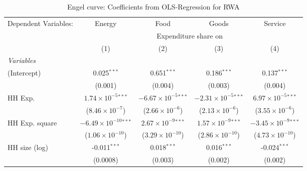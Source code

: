 
\begin{table}[htbp!]
   \centering
   \small
   \begin{adjustbox}{width = 1\textwidth, max height = 0.95\textheight, center}
      \begin{threeparttable}[b]
         \caption{\label{tab:Engel_parametric_RWA} Engel curve: Coefficients from OLS-Regression for RWA}
         \begin{tabular}{lcccc}
            \tabularnewline \midrule \midrule
            Dependent Variables: & Energy                          & Food                           & Goods                          & Service\\  
             & \multicolumn{4}{c}{Expenditure share on} \\ 
                                 & (1)                             & (2)                            & (3)                            & (4)\\  
            \midrule
            \emph{Variables}\\
            (Intercept)          & 0.025$^{***}$                   & 0.651$^{***}$                  & 0.186$^{***}$                  & 0.137$^{***}$\\   
                                 & (0.001)                         & (0.004)                        & (0.003)                        & (0.004)\\   
            HH Exp.              & $1.74\times 10^{-5}$$^{***}$    & $-6.67\times 10^{-5}$$^{***}$  & $-2.31\times 10^{-5}$$^{***}$  & $6.97\times 10^{-5}$$^{***}$\\    
                                 & ($8.46\times 10^{-7}$)          & ($2.66\times 10^{-6}$)         & ($2.13\times 10^{-6}$)         & ($3.55\times 10^{-6}$)\\    
            HH Exp. square       & $-6.49\times 10^{-10}$$^{***}$  & $2.67\times 10^{-9}$$^{***}$   & $1.57\times 10^{-9}$$^{***}$   & $-3.45\times 10^{-9}$$^{***}$\\    
                                 & ($1.06\times 10^{-10}$)         & ($3.29\times 10^{-10}$)        & ($2.86\times 10^{-10}$)        & ($4.73\times 10^{-10}$)\\    
            HH size (log)        & -0.011$^{***}$                  & 0.018$^{***}$                  & 0.016$^{***}$                  & -0.024$^{***}$\\   
                                 & (0.0008)                        & (0.003)                        & (0.002)                        & (0.002)\\   

\end{tabular}
\end{threeparttable}
\end{adjustbox}
\end{table}
